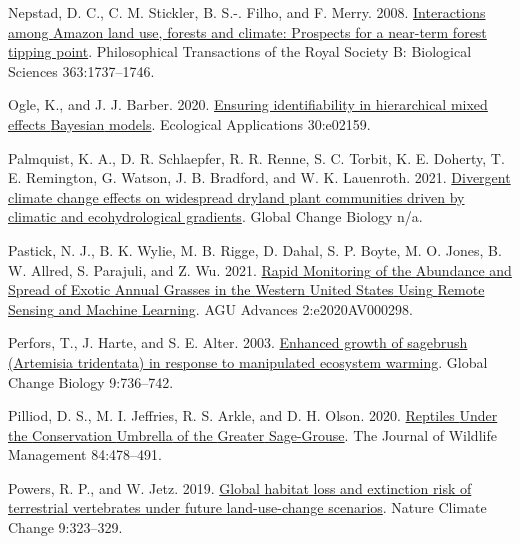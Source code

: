 \documentclass[
  12pt,
]{article}
\newlength{\cslhangindent}
\newlength{\cslentryspacingunit} %
\newenvironment{CSLReferences}[2] %
 {%
  \setlength{\parindent}{0pt}
  \ifodd #1
  \let\oldpar\par
  \def\par{\hangindent=\cslhangindent\oldpar}
  \fi
  \setlength{\parskip}{#2\cslentryspacingunit}
 }%
 {}
\begin{document}
\begin{CSLReferences}{1}{0}
\leavevmode{}%
Nepstad, D. C., C. M. Stickler, B. S.-. Filho, and F. Merry. 2008. \href{https://doi.org/10.1098/rstb.2007.0036}{Interactions among {Amazon} land use, forests and climate: Prospects for a near-term forest tipping point}. Philosophical Transactions of the Royal Society B: Biological Sciences 363:1737--1746.

\leavevmode{}%
Ogle, K., and J. J. Barber. 2020. \href{https://doi.org/10.1002/eap.2159}{Ensuring identifiability in hierarchical mixed effects {Bayesian} models}. Ecological Applications 30:e02159.

\leavevmode{}%
Palmquist, K. A., D. R. Schlaepfer, R. R. Renne, S. C. Torbit, K. E. Doherty, T. E. Remington, G. Watson, J. B. Bradford, and W. K. Lauenroth. 2021. \href{https://doi.org/10.1111/gcb.15776}{Divergent climate change effects on widespread dryland plant communities driven by climatic and ecohydrological gradients}. Global Change Biology n/a.

\leavevmode{}%
Pastick, N. J., B. K. Wylie, M. B. Rigge, D. Dahal, S. P. Boyte, M. O. Jones, B. W. Allred, S. Parajuli, and Z. Wu. 2021. \href{https://doi.org/10.1029/2020AV000298}{Rapid {Monitoring} of the {Abundance} and {Spread} of {Exotic} {Annual} {Grasses} in the {Western} {United} {States} {Using} {Remote} {Sensing} and {Machine} {Learning}}. AGU Advances 2:e2020AV000298.

\leavevmode{}%
Perfors, T., J. Harte, and S. E. Alter. 2003. \href{https://doi.org/10.1046/j.1365-2486.2003.00559.x}{Enhanced growth of sagebrush ({Artemisia} tridentata) in response to manipulated ecosystem warming}. Global Change Biology 9:736--742.

\leavevmode{}%
Pilliod, D. S., M. I. Jeffries, R. S. Arkle, and D. H. Olson. 2020. \href{https://doi.org/10.1002/jwmg.21821}{Reptiles {Under} the {Conservation} {Umbrella} of the {Greater} {Sage}-{Grouse}}. The Journal of Wildlife Management 84:478--491.

\leavevmode{}%
Powers, R. P., and W. Jetz. 2019. \href{https://doi.org/10.1038/s41558-019-0406-z}{Global habitat loss and extinction risk of terrestrial vertebrates under future land-use-change scenarios}. Nature Climate Change 9:323--329.


\end{CSLReferences}
\end{document}

